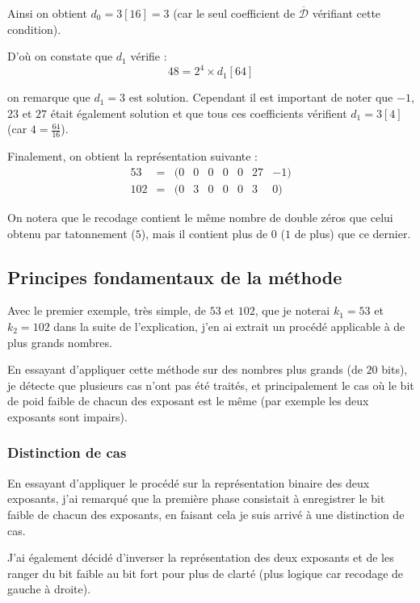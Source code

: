 \documentclass[12pt, a4paper]{memoir}
\begin{document}
Ainsi on obtient $d_0 = 3 [16] = 3$ (car le seul coefficient de $\overline{\mathcal{D}}$ vérifiant cette condition).

D'où on constate que $d_1$ vérifie :
\begin{equation}
 48 = 2^4 \times d_1 [64]
\end{equation}
 
on remarque que $d_1 = 3$ est solution.
Cependant il est important de noter que $-1$, $23$ et $27$ était également solution et que tous ces coefficients
vérifient $d_1 = 3 [4]$ (car $4 = \frac{64}{16}$).

Finalement, on obtient la représentation suivante :
  $$\begin{array}{ccccccccc}
  53 & = & (0 & 0 & 0 & 0 & 0 & 27 & -1) \\
  102 & = & (0 & 3 & 0 & 0 & 0 & 3 & 0)
 \end{array}$$

 On notera que le recodage contient le même nombre de double zéros que celui obtenu par tatonnement ($5$), mais il
 contient plus de $0$ ($1$ de plus) que ce dernier.
 
\subsection{Principes fondamentaux de la méthode}
 
 Avec le premier exemple, très simple, de $53$ et $102$, que je noterai $k_1 = 53$ et $k_2 = 102$ 
 dans la suite de l'explication, j'en ai extrait un procédé applicable à de plus grands nombres.
 
 En essayant d'appliquer cette méthode sur des nombres plus grands (de $20$ bits), je détecte que plusieurs cas n'ont 
 pas été traités, et principalement le cas où le bit de poid faible de chacun des exposant est le même (par exemple les deux 
 exposants sont impairs).
 
 \subsubsection{Distinction de cas}
 
 En essayant d'appliquer le procédé sur la représentation binaire des deux exposants, j'ai remarqué que la première
 phase consistait à enregistrer le bit faible de chacun des exposants, en faisant cela je suis arrivé à une distinction
 de cas.
 
 J'ai également décidé d'inverser la représentation des deux exposants et de les ranger du bit faible au bit fort pour 
 plus de clarté (plus logique car recodage de gauche à droite).
 
\end{document}
